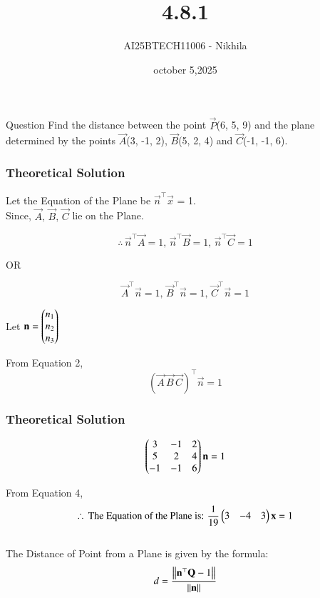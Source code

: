 \documentclass{beamer}
\title
{4.8.1}
\date{october 5,2025}
\author 
{AI25BTECH11006 - Nikhila}
\begin{document}
\frame{\titlepage}
\begin{frame}{Question}
\centering
Find the distance between the point $\vec{P}$(6, 5, 9) and the plane determined by the points $\vec{A}$(3, -1, 2), $\vec{B}$(5, 2, 4) and $\vec{C}$(-1, -1, 6).
\end{frame}


\begin{frame}[fragile]
    \frametitle{Theoretical Solution}
Let the Equation of the Plane be $\vec{n}^\top\vec{x}$ = 1.\\

Since, $\vec{A}, \, \vec{B}, \, \vec{C}$ lie on the Plane.

\begin{equation}
    \therefore \, \vec{n}^\top\vec{A}=1, \, \vec{n}^\top\vec{B}=1,  \, \vec{n}^\top\vec{C}=1
\end{equation}

\begin{center}
    OR
\end{center}

\begin{equation}
    \vec{A}^\top\vec{n}=1, \, \vec{B}^\top\vec{n}=1, \, \vec{C}^\top\vec{n}=1
\end{equation}

Let $\mathbf{n} = \begin{pmatrix}n_1 \\ n_2 \\ n_3\end{pmatrix}$

From Equation 2,
\begin{equation}
    (\vec{A} \, \vec{B} \, \vec{C})^\top \vec{n}=1
\end{equation}
\end{frame}

\begin{frame}[fragile]
\frametitle{Theoretical Solution}
\begin{equation}
\begin{pmatrix}3 & -1 & 2 \\ 5 & 2 & 4\\ -1 & -1 & 6\end{pmatrix}\mathbf{n} = 1
\end{equation}


From Equation 4,
\begin{equation}
\therefore \, \text{The Equation of the Plane is: } \dfrac{1}{19}\begin{pmatrix}3 & -4 & 3\end{pmatrix}\mathbf{x} = 1
\end{equation}\\

The Distance of Point from a Plane is given by the formula:
\begin{equation}
    d = \dfrac{\left\lVert\mathbf{n}^\top\mathbf{Q}-1\right\rVert}{\left\lVert\mathbf{n}\right\rVert}
\end{equation}
\end{frame}
\end{document}
